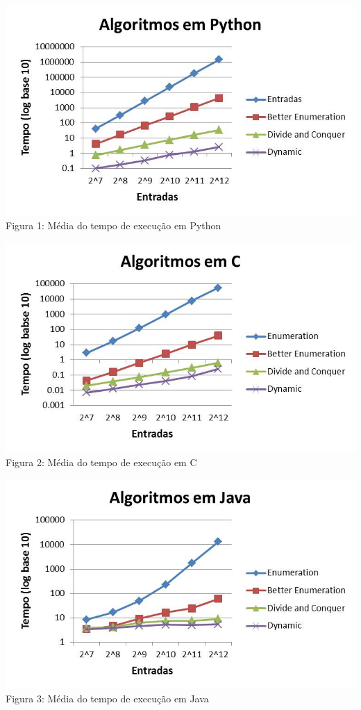 \documentclass[
	12pt,				%
	oneside,   	        %
	a4paper,			%
	english,			%
	french,				%
	spanish,			%
	brazil,				%
	]{pacotes/abntex2}
\begin{document}
\begin{center}
    \includegraphics[scale=0.9]{figuras/python.jpg}\\
    \caption{Figura 1: Média do tempo de execução em Python}
\end{center}

\begin{center}
    \includegraphics[scale=0.9]{figuras/c.jpg}\\
    \caption{Figura 2: Média do tempo de execução em C}
\end{center}

\begin{center}
    \includegraphics[scale=0.9]{figuras/java.jpg}\\
    \caption{Figura 3: Média do tempo de execução em Java}
\end{center}
\end{document}
